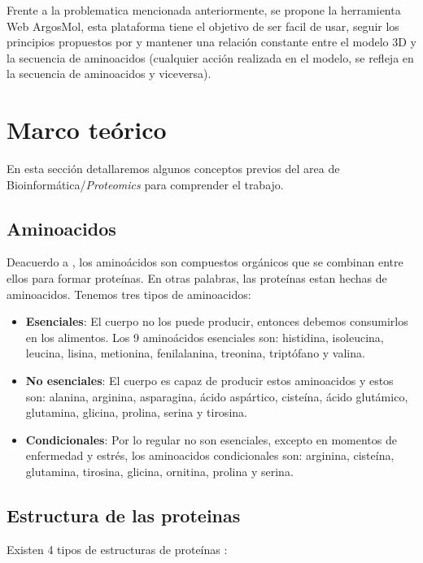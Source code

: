 \documentclass{article}
\begin{document}
		
	Frente a la problematica mencionada anteriormente, se propone la herramienta Web ArgosMol, esta plataforma tiene el objetivo de ser facil de usar, seguir los principios propuestos por \cite{youkharibache2017twelve} y mantener una relación constante entre el modelo 3D y la secuencia de aminoacidos (cualquier acción realizada en el modelo, se refleja en la secuencia de aminoacidos y viceversa). 	
	
	
\section{Marco teórico}
	
	En esta sección detallaremos algunos conceptos previos del area de Bioinformática/\textit{Proteomics} para comprender el trabajo.
	
	
	\subsection{Aminoacidos}
		
	Deacuerdo a \cite{medlineplus_2021}, los aminoácidos son compuestos orgánicos que se combinan entre ellos para formar proteínas. En otras palabras, las proteínas estan hechas de aminoacidos. Tenemos tres tipos de aminoacidos: 
	
	\begin{itemize}
		\item \textbf{Esenciales}: El cuerpo no los puede producir, entonces debemos consumirlos en los alimentos. Los 9 aminoácidos esenciales son: histidina, isoleucina, leucina, lisina, metionina, fenilalanina, treonina, triptófano y valina.
		\item \textbf{No esenciales}: El cuerpo es capaz de producir estos aminoacidos y estos son: alanina, arginina, asparagina, ácido aspártico, cisteína, ácido glutámico, glutamina, glicina, prolina, serina y tirosina.
		\item \textbf{Condicionales}: Por lo regular no son esenciales, excepto en momentos de enfermedad y estrés, los aminoacidos condicionales son: arginina, cisteína, glutamina, tirosina, glicina, ornitina, prolina y serina. 
	\end{itemize}
	
	\subsection{Estructura de las proteinas}
	
	Existen 4 tipos de estructuras de proteínas \citep{russell2002igenetics}:
	
\end{document}
